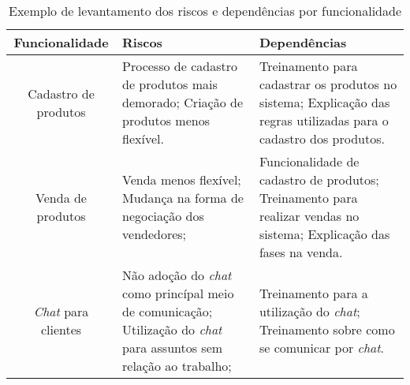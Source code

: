     \begin{table}[h!]
      \centering
      \begin{tabular}{|c|p{4cm}|p{6cm}|}
        \hline
        \textbf{Funcionalidade} &
        \textbf{Riscos}  &
        \textbf{Dependências}
        \\ \hline
        Cadastro de produtos &
        Processo de cadastro de produtos mais demorado; \newline
        Criação de produtos menos flexível. &
        Treinamento para cadastrar os produtos no sistema;\newline
        Explicação das regras utilizadas para o cadastro dos produtos.
        \\ \hline
        Venda de produtos &
        Venda menos flexível; \newline
        Mudança na forma de negociação dos vendedores; &
        Funcionalidade de cadastro de produtos; \newline
        Treinamento para realizar vendas no sistema; \newline
        Explicação das fases na venda.
        \\ \hline
        \textit{Chat} para clientes &
        Não adoção do \textit{chat} como princípal meio de comunicação; \newline
        Utilização do \textit{chat} para assuntos sem relação ao trabalho; &
        Treinamento para a utilização do \textit{chat}; \newline
        Treinamento sobre como se comunicar por \textit{chat}.
        \\ \hline
      \end{tabular}
      \caption{Exemplo de levantamento dos riscos e dependências por funcionalidade}
      \label{Tabela:3}
    \end{table}

